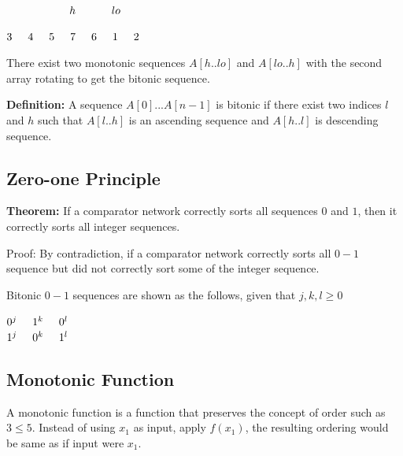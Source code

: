 \documentclass[twoside]{article}
\begin{document}
$\hspace{0.5cm}\hspace{0.5cm}\hspace{1cm}h\hspace{0.5cm}\hspace{0.65cm}lo\hspace{0.5cm}\hspace{0.5cm}$

$3\hspace{0.5cm}4\hspace{0.5cm}5\hspace{0.5cm}7\hspace{0.5cm}6\hspace{0.5cm}1\hspace{0.5cm}2\hspace{0.5cm}$

There exist two monotonic sequences $A[h..lo]$ and $A[lo..h]$ with the second array rotating to get the bitonic sequence. 

\textbf{Definition:} A sequence $A[0]...A[n-1]$ is bitonic if there exist two indices $l$ and $h$ such that $A[l..h]$ is an ascending sequence and $A[h..l]$ is descending sequence. 

\subsection{Zero-one Principle}
\textbf{Theorem:} If a comparator network correctly sorts all sequences $0$ and $1$, then it correctly sorts all integer sequences. 

Proof: By contradiction, if a comparator network correctly sorts all $0-1$ sequence but did not correctly sort some of the integer sequence. 

Bitonic $0-1$ sequences are shown as the follows, given that $j,k,l\geq 0$

$0^j\hspace{0.5cm}1^k\hspace{0.5cm}0^l$\\

$1^j\hspace{0.5cm}0^k\hspace{0.5cm}1^l$

\subsection{Monotonic Function}
A monotonic function is a function that preserves the concept of order such as $3\leq5$. Instead of using $x_1$ as input, apply $f(x_1)$, the resulting ordering would be same as if input were $x_1$. 
\end{document}
